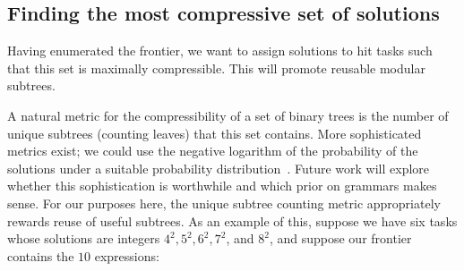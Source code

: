 \documentclass{article}
\begin{document}
\subsection{Finding the most compressive set of solutions}

Having enumerated the frontier, we want to assign solutions
to hit tasks such that this set is maximally compressible. This will
promote reusable modular subtrees. 

A natural metric for the compressibility of a set of binary trees is
the number of unique subtrees (counting leaves) that this set
contains. More sophisticated metrics exist; we could use the negative
logarithm of the probability of the solutions under a suitable
probability distribution~\cite{DBLP:journals/tit/BarronRY98}. Future
work will explore whether this sophistication is worthwhile and which
prior on grammars makes sense. For our purposes here, the unique
subtree counting metric appropriately rewards reuse of useful
subtrees. As an example of this, suppose we have six tasks whose
solutions are integers $4^2, 5^2, 6^2, 7^2$, and $8^2$, and suppose
our frontier contains the $10$ expressions:
\vspace{-.3cm}
\captionsetup[subfigure]{labelformat=empty} 
\end{document}
